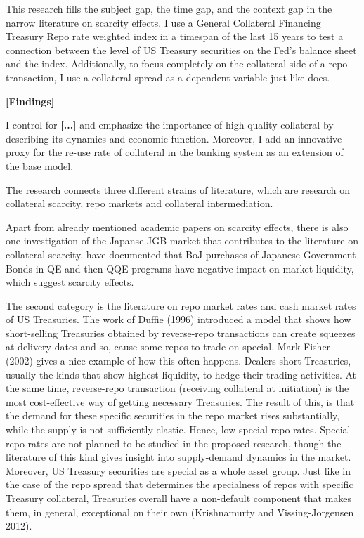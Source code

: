 \documentclass[11pt,a4paper,english,oneside]{article}
\begin{document}
This research fills the subject gap, the time gap, and the context gap in the narrow literature on scarcity effects. I use a General Collateral Financing Treasury Repo rate weighted index in a timespan of the last 15 years to test a connection between the level of US Treasury securities on the Fed's balance sheet and the index. Additionally, to focus completely on the collateral-side of a repo transaction, I use a collateral spread as a dependent variable just like \citet{nyborg2019b} does.

\textbf{[Findings]}

I control for \textbf{[...]} and emphasize the importance of high-quality collateral by describing its dynamics and economic function. Moreover, I add an innovative proxy for the re-use rate of collateral in the banking system as an extension of the base model.

The research connects three different strains of literature, which are research on collateral scarcity, repo markets and collateral intermediation.

Apart from already mentioned academic papers on scarcity effects, there is also one investigation of the Japanse JGB market that contributes to the literature on collateral scarcity.  have documented that BoJ purchases of Japanese Government Bonds in QE and then QQE programs have negative impact on market liquidity, which suggest scarcity effects.

The second category is the literature on repo market rates and cash market rates of US Treasuries. The work of Duffie (1996) introduced a model that shows how short-selling Treasuries obtained by reverse-repo transactions can create squeezes at delivery dates and so, cause some repos to trade on special. Mark Fisher (2002) gives a nice example of how this often happens. Dealers short Treasuries, usually the kinds that show highest liquidity, to hedge their trading activities. At the same time, reverse-repo transaction (receiving collateral at initiation) is the most cost-effective way of getting necessary Treasuries. The result of this, is that the demand for these specific securities in the repo market rises substantially, while the supply is not sufficiently elastic. Hence, low special repo rates. Special repo rates are not planned to be studied in the proposed research, though the literature of this kind gives insight into supply-demand dynamics in the market. Moreover, US Treasury securities are special as a whole asset group. Just like in the case of the repo spread that determines the specialness of repos with specific Treasury collateral, Treasuries overall have a non-default component that makes them, in general, exceptional on their own (Krishnamurty and Vissing-Jorgensen 2012).
\end{document}
